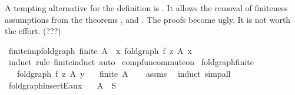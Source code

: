 \begin{isabellebody}
\begin{isamarkuptext}
A tempting alternative for the definition is
  .
  It allows the removal of finiteness assumptions from the theorems
  ,  and .
  The proofs become ugly. It is not worth the effort. (???)%
\end{isamarkuptext}\isamarkuptrue%
\isamarkupfalse%
\ finite{\isacharunderscore}{\kern0pt}imp{\isacharunderscore}{\kern0pt}fold{\isacharunderscore}{\kern0pt}graph{\isacharcolon}{\kern0pt}\ {\isachardoublequoteopen}finite\ A\ {\isasymLongrightarrow}\ {\isasymexists}x{\isachardot}{\kern0pt}\ fold{\isacharunderscore}{\kern0pt}graph\ f\ z\ A\ x{\isachardoublequoteclose}\isanewline
%
\isadelimproof
\ \ %
\endisadelimproof
%
\isatagproof
{}\isamarkupfalse%
\ {\isacharparenleft}{\kern0pt}induct\ rule{\isacharcolon}{\kern0pt}\ finite{\isacharunderscore}{\kern0pt}induct{\isacharparenright}{\kern0pt}\ auto%
\endisatagproof
{\isafoldproof}%
%
\isadelimproof
%
\endisadelimproof
%
\isadelimdocument
%
\endisadelimdocument
%
\isatagdocument
%
\isamarkuptrue%
%
\endisatagdocument
{\isafolddocument}%
%
\isadelimdocument
%
\endisadelimdocument
{}\isamarkupfalse%
\ comp{\isacharunderscore}{\kern0pt}fun{\isacharunderscore}{\kern0pt}commute{\isacharunderscore}{\kern0pt}on\isanewline
{}\isanewline
\isanewline
{}\isamarkupfalse%
\ fold{\isacharunderscore}{\kern0pt}graph{\isacharunderscore}{\kern0pt}finite{\isacharcolon}{\kern0pt}\isanewline
\ \ \ {\isachardoublequoteopen}fold{\isacharunderscore}{\kern0pt}graph\ f\ z\ A\ y{\isachardoublequoteclose}\isanewline
\ \ \ {\isachardoublequoteopen}finite\ A{\isachardoublequoteclose}\isanewline
%
\isadelimproof
\ \ %
\endisadelimproof
%
\isatagproof
{}\isamarkupfalse%
\ assms\ \isamarkupfalse%
\ induct\ simp{\isacharunderscore}{\kern0pt}all%
\endisatagproof
{\isafoldproof}%
%
\isadelimproof
\isanewline
%
\endisadelimproof
\isanewline
{}\isamarkupfalse%
\ fold{\isacharunderscore}{\kern0pt}graph{\isacharunderscore}{\kern0pt}insertE{\isacharunderscore}{\kern0pt}aux{\isacharcolon}{\kern0pt}\isanewline
\ \ \ {\isachardoublequoteopen}A\ {\isasymsubseteq}\ S{\isachardoublequoteclose}\isanewline

\end{isabellebody}
